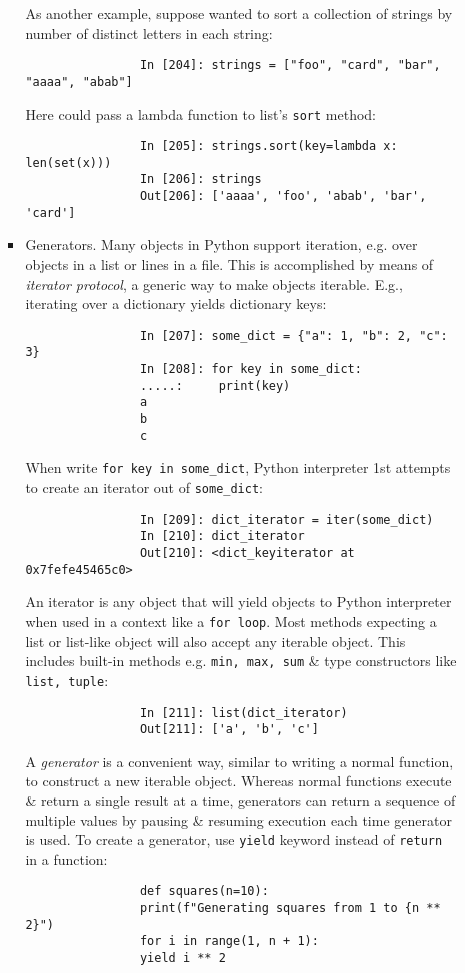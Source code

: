 \documentclass{article}
\begin{document}
\begin{itemize}
\begin{itemize}
\begin{itemize}
			As another example, suppose wanted to sort a collection of strings by number of distinct letters in each string:
			\begin{verbatim}
				In [204]: strings = ["foo", "card", "bar", "aaaa", "abab"]
			\end{verbatim}
			Here could pass a lambda function to list's {\tt sort} method:
			\begin{verbatim}
				In [205]: strings.sort(key=lambda x: len(set(x)))
				In [206]: strings
				Out[206]: ['aaaa', 'foo', 'abab', 'bar', 'card']
			\end{verbatim}
			\item {\sf Generators.} Many objects in Python support iteration, e.g. over objects in a list or lines in a file. This is accomplished by means of {\it iterator protocol}, a generic way to make objects iterable. E.g., iterating over a dictionary yields dictionary keys:
			\begin{verbatim}
				In [207]: some_dict = {"a": 1, "b": 2, "c": 3}
				In [208]: for key in some_dict:
				.....:     print(key)
				a
				b
				c
			\end{verbatim}
			When write \verb|for key in some_dict|, Python interpreter 1st attempts to create an iterator out of \verb|some_dict|:
			\begin{verbatim}
				In [209]: dict_iterator = iter(some_dict)
				In [210]: dict_iterator
				Out[210]: <dict_keyiterator at 0x7fefe45465c0>
			\end{verbatim}
			An iterator is any object that will yield objects to Python interpreter when used in a context like a {\tt for loop}. Most methods expecting a list or list-like object will also accept any iterable object. This includes built-in methods e.g. {\tt min, max, sum} \& type constructors like {\tt list, tuple}:
			\begin{verbatim}
				In [211]: list(dict_iterator)
				Out[211]: ['a', 'b', 'c']
			\end{verbatim}
			A {\it generator} is a convenient way, similar to writing a normal function, to construct a new iterable object. Whereas normal functions execute \& return a single result at a time, generators can return a sequence of multiple values by pausing \& resuming execution each time generator is used. To create a generator, use {\tt yield} keyword instead of {\tt return} in a function:
			\begin{verbatim}
				def squares(n=10):
				print(f"Generating squares from 1 to {n ** 2}")
				for i in range(1, n + 1):
				yield i ** 2
			\end{verbatim}

\end{itemize}
\end{itemize}
\end{itemize}
\end{document}

